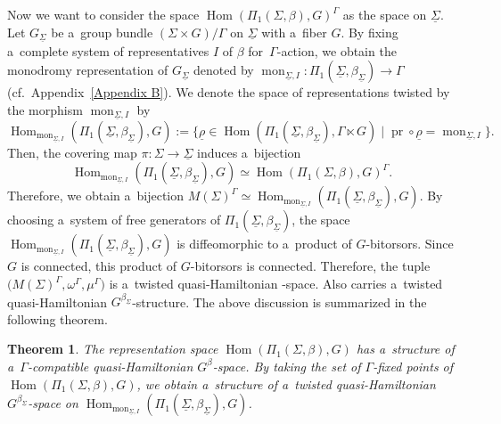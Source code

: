 \documentclass[10pt,a4paper]{amsart}
\numberwithin{equation}{section}
\newtheorem{Theorem}{Theorem}[section]
\theoremstyle{definition}
\newcommand{\Hom}{\operatorname{Hom}}
\newcommand{\mon}{\operatorname{mon}}
\newcommand{\pr}{\operatorname{pr}}
\begin{document}
Now we want to consider the space $\Hom(\Pi_1(\Sigma,\beta),G)^{\Gamma}$ as the space on $\underline{\Sigma}$.
Let $G_{\underline{\Sigma}}$ be a~group bundle $(\Sigma \times G) /\Gamma$ on $\underline{\Sigma}$ with a~fiber $G$.
By fixing a~complete system of representatives $I$ of $\beta$ for~$\Gamma$-action,
we obtain the monodromy representation of $G_{\underline{\Sigma}}$ denoted by $\mon_{\underline{\Sigma},I} \colon \Pi_1(\underline{\Sigma},\beta_{\underline{\Sigma}}) \to \Gamma$ (cf.\ Appendix~\ref{Appendix B}).
We denote the space of representations twisted by the morphism $\mon_{\underline{\Sigma},I}$ by
\[
\Hom_{\mon_{\underline{\Sigma},I}}(\Pi_1(\underline{\Sigma},\beta_{\underline{\Sigma}}),G):= \bigr\{\underline{\rho} \in \Hom(\Pi_1(\underline{\Sigma},\beta_{\underline{\Sigma}}),\Gamma \ltimes G)\mid \pr \circ \underline{\rho} = \mon_{\underline{\Sigma},I}\bigr\}.
\]
Then, the covering map $\pi \colon \Sigma \to \underline{\Sigma}$ induces a~bijection
\[
\Hom_{\mon_{\underline{\Sigma},I}}(\Pi_1(\underline{\Sigma},\beta_{\underline{\Sigma}}),G) \simeq \Hom(\Pi_1(\Sigma,\beta),G)^{\Gamma}.
\]
Therefore, we obtain a~bijection
$M(\Sigma)^{\Gamma} \simeq \Hom_{\mon_{\underline{\Sigma},I}}(\Pi_1(\underline{\Sigma},\beta_{\underline{\Sigma}}),G)$.
By choosing a~system of free generators of $\Pi_1(\underline{\Sigma},\beta_{\underline{\Sigma}})$, the space $\Hom_{\mon_{\underline{\Sigma},I}}(\Pi_1(\underline{\Sigma},\beta_{\underline{\Sigma}}),G)$ is diffeomorphic to a~product of $G$-bitorsors.
Since $G$ is connected, this product of $G$-bitorsors is connected.
Therefore, the tuple~${\bigl(M(\Sigma)^{\Gamma}, \omega^{\Gamma}, \mu^{\Gamma}\bigr)}$ is a~twisted quasi-Hamiltonian -space.
Also \smash{$\Hom_{\mon_{\underline{\Sigma},I}}(\Pi_1(\underline{\Sigma},\beta_{\underline{\Sigma}}),G)$} carries a~twisted quasi-Hamiltonian $G^{\beta_{\underline{\Sigma}}}$-structure.
The above discussion is summarized in the following theorem.

\begin{Theorem}\label{q-Ham str on rep sp}
 The representation space $\Hom(\Pi_1(\Sigma,\beta),G)$ has a~structure of a~$\Gamma$-compatible quasi-Hamiltonian $G^{\beta}$-space.
 By taking the set of $\Gamma$-fixed points of $\Hom(\Pi_1(\Sigma,\beta),G)$, we obtain a~structure of a~twisted quasi-Hamiltonian $G^{\beta_{\underline{\Sigma}}}$-space on $\Hom_{\mon_{\underline{\Sigma}, I}}(\Pi_1(\underline{\Sigma},\beta_{\underline{\Sigma}}),G)$.
\end{Theorem}
\end{document}
